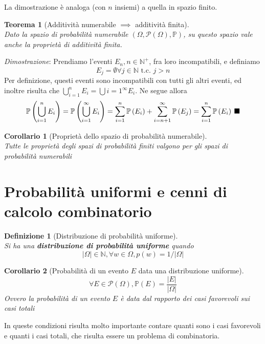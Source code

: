 \documentclass{article}
\newtheorem{theorem}{Teorema}[section]
\newtheorem{corollary}{Corollario}[theorem]
\newtheorem{definition}{Definizione}[section]
\newcommand{\qed}{\rule{0.7em}{0.7em}}
\newcommand{\PS}[1]{\mathcal{P}\left(#1\right)}
\newcommand{\Prob}[1]{\mathbb{P}\left(#1\right)}
\begin{document}
    La dimostrazione è analoga (con $n$ insiemi) a quella in spazio finito. \\
    \begin{theorem}[Additività numerabile $\implies$ additività finita] \, \\
        Dato la spazio di probabilità numerabile $\left(\Omega, \PS{\Omega}, \mathbb{P}\right)$,
        su questo spazio vale anche la proprietà di additività finita.
    \end{theorem}
    \textit{Dimostrazione}:
        Prendiamo l'eventi $E_n, n \in \mathbb{N}^+$, fra loro incompatibili, e definiamo 
        $$E_j = \emptyset \forall j \in \mathbb{N} \textrm{ t.c. } j > n$$
        Per definizione, questi eventi sono incompatibili con tutti gli altri eventi, ed inoltre risulta che 
        $\bigcup_{i=1}^n E_i = \bigcup{i=1}^\infty E_i$. Ne segue allora 
        $$\Prob{\bigcup_{i=1}^n E_i} = \Prob{\bigcup_{i=1}^\infty E_i} = \sum_{i=1}^n \Prob{E_i} + 
            \sum_{i=n+1}^\infty \Prob{E_j} = \sum_{i=1}^n \Prob{E_i} \; \qed$$
    \begin{corollary}[Proprietà dello spazio di probabilità numerabile] \, \\
        Tutte le proprietà degli spazi di probabilità finiti valgono per gli spazi di probabilità numerabili
    \end{corollary}
\section{Probabilità uniformi e cenni di calcolo combinatorio}
    \begin{definition}[Distribuzione di probabilità uniforme] \, \\
        Si ha una \textbf{distribuzione di probabilità uniforme} quando 
        $$|\Omega| \in \mathbb{N}, \forall w \in \Omega, p\left(w\right) = 1/|\Omega|$$
    \end{definition}
    \begin{corollary}[Probabilità di un evento $E$ data una distribuzione uniforme]
        $$\forall E \in \PS{\Omega}, \Prob{E} = \frac{|E|}{|\Omega|}$$
        Ovvero la probabilità di un evento $E$ è data dal rapporto dei casi favorevoli sui casi totali
    \end{corollary}
    In queste condizioni risulta molto importante contare quanti sono i casi favorevoli e quanti i casi totali, che risulta 
    essere un problema di combinatoria.
\end{document}
